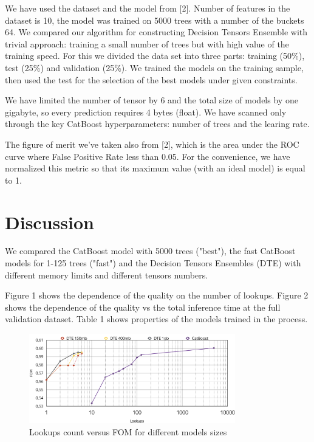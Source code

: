 \documentclass[a4paper]{jpconf}
\begin{document}
We have used the dataset and the model from [2]. Number of features in the dataset is 10, the model was trained on 5000 trees with a number of the buckets 64. We compared our algorithm for constructing Decision Tensors Ensemble with trivial approach: training a small number of trees but with high value of the training speed.
For this we divided the data set into three parts: training (50\%), test (25\%) and validation (25\%). We trained the models on the training sample, then used the test for the selection of the best models under given constraints.

We have limited the number of tensor by 6 and the total size of models by one gigabyte, so every prediction requires 4 bytes (float). We have scanned only through the key CatBoost hyperparameters: number of trees and the learing rate.

The figure of merit we've taken also from [2], which is the area under the ROC curve where False Positive Rate less than 0.05. For the convenience, we have normalized this metric so that its maximum value (with an ideal model) is equal to 1.

\section{Discussion}

We compared the CatBoost model with 5000 trees ("best"), the fast CatBoost models for 1-125 trees ("fast") and the Decision Tensors Ensembles (DTE) with different memory limits and different tensors numbers.

Figure 1 shows the dependence of the quality on the number of lookups. Figure 2 shows the dependence of the quality vs the total inference time at the full validation dataset. Table 1 shows properties of the models trained in the process.

\begin{figure}
\begin{center}
\includegraphics[width=0.8\textwidth]{"lookups.png"}
\caption{Lookups count versus FOM for different models sizes}
\end{center}
\end{figure}
\end{document}
